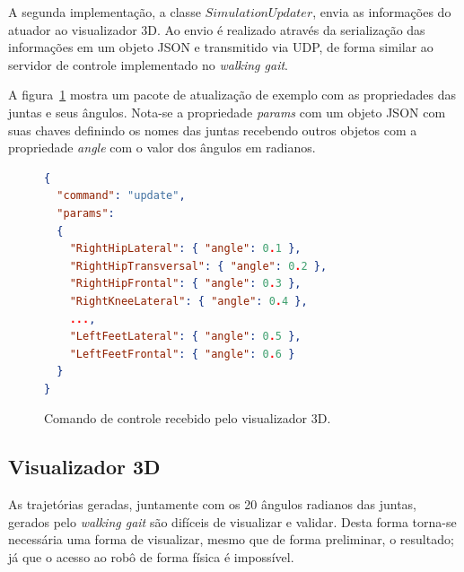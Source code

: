 A segunda implementação, a classe $SimulationUpdater$, envia as informações do atuador ao visualizador 3D. Ao envio é realizado através da serialização das informações em um objeto JSON e transmitido via UDP, de forma similar ao servidor de controle implementado no \textit{walking gait}.

A figura~\ref{fig:architecture:walkinggait:visualization:json} mostra um pacote de atualização de exemplo com as propriedades das juntas e seus ângulos. Nota-se a propriedade \textit{params} com um objeto JSON com suas chaves definindo os nomes das juntas recebendo outros objetos com a propriedade \textit{angle} com o valor dos ângulos em radianos.

\begin{figure}[htb]
	\begin{lstlisting}[language=json,firstnumber=1]
{
  "command": "update",
  "params":
  {
    "RightHipLateral": { "angle": 0.1 },
    "RightHipTransversal": { "angle": 0.2 },
    "RightHipFrontal": { "angle": 0.3 },
    "RightKneeLateral": { "angle": 0.4 },
	...,
    "LeftFeetLateral": { "angle": 0.5 },
    "LeftFeetFrontal": { "angle": 0.6 }
  }
}
\end{lstlisting}
	\caption{Comando de controle recebido pelo visualizador 3D.}
	\label{fig:architecture:walkinggait:visualization:json}
\end{figure}

\subsection{Visualizador 3D}

As trajetórias geradas, juntamente com os 20 ângulos radianos das juntas, gerados pelo \textit{walking gait} são difíceis de visualizar e validar. Desta forma torna-se necessária uma forma de visualizar, mesmo que de forma preliminar, o resultado; já que o acesso ao robô de forma física é impossível.

